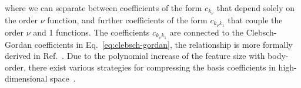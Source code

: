 where we can separate between coefficients of the form $c_{k_\nu}$ that depend solely on the order $\nu$ function, and further coefficients of the form $c_{k_\nu k_1}$ that couple the order $\nu$ and 1 functions.
The coefficients $c_{k_\nu k_1}$ are connected to the Clebsch-Gordan coefficients in Eq.~\eqref{eq:clebsch-gordan}, the relationship is more formally derived in Ref.~\cite{nigam2020recursive}. 
Due to the polynomial increase of the feature size with body-order, there exist various strategies for compressing the basis coefficients in high-dimensional space~\cite{kondor2018clebsch,yan2019fourier,nigam2020recursive}.

%
%

